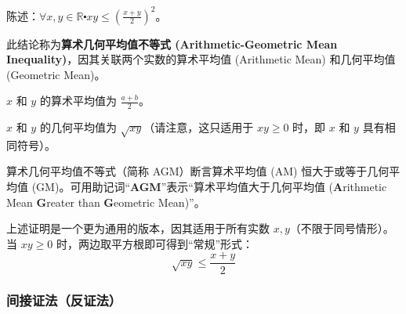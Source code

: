 \begin{example}[算术几何平均值不等式的一个实例]

    \begin{center}
        陈述：$\forall x, y \in \mathbb{R} \centerdot xy \le (\frac{x+y}{2})^2$。
    \end{center}
    \begin{center}
        \noindent {}
    \end{center}
    此结论称为\textbf{算术几何平均值不等式 (Arithmetic-Geometric Mean Inequality)}，因其关联两个实数的算术平均值 (Arithmetic Mean) 和几何平均值 (Geometric Mean)。

    $x$ 和 $y$ 的算术平均值为 $\frac{a+b}{2}$。

    $x$ 和 $y$ 的几何平均值为 $\sqrt{xy}$（请注意，这只适用于 $xy \ge 0$ 时，即 $x$ 和 $y$ 具有相同符号）。

    算术几何平均值不等式（简称 AGM）断言算术平均值 (AM) 恒大于或等于几何平均值 (GM)。可用助记词``\textbf{AGM}''表示``算术平均值大于几何平均值 (\textbf{A}rithmetic Mean \textbf{G}reater than \textbf{G}eometric Mean)''。

    上述证明是一个更为通用的版本，因其适用于所有实数 $x,y$（不限于同号情形）。当 $xy \ge 0$ 时，两边取平方根即可得到``常规''形式：
    \[\sqrt{xy} \le \frac{x+y}{2}\]
\end{example}

\clearpage

\subsubsection*{间接证法（反证法）}

